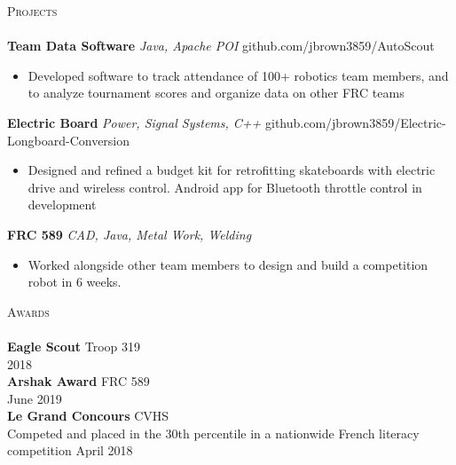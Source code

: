 \documentclass[a4paper]{article}
\newcommand{\lineunder} {
    \vspace*{-8pt} \\
    \hspace*{-18pt} \hrulefill \\
}
\newcommand{\header} [1] {
    {\hspace*{-18pt}\vspace*{6pt} \textsc{#1}}
    \vspace*{-6pt} \lineunder
}
\begin{document}
\header{Projects}
{\textbf{Team Data Software}} {\sl Java, Apache POI} \hfill github.com/jbrown3859/AutoScout\\
\begin{itemize} \itemsep 1pt
	\item Developed software to track attendance of 100+ robotics team members, and to analyze tournament scores and organize data on other FRC teams\\
\end{itemize}
\vspace*{2mm}
{\textbf{Electric Board}} {\sl Power, Signal Systems, C++} \hfill github.com/jbrown3859/Electric-Longboard-Conversion\\
\begin{itemize} \itemsep 1pt
	\item Designed and refined a budget kit for retrofitting skateboards with electric drive and wireless control. Android app for Bluetooth throttle control in development\\
\end{itemize}
\vspace*{2mm}
{\textbf{FRC 589}} {\sl CAD, Java, Metal Work, Welding} \\
\begin{itemize} \itemsep 1pt
	\item Worked alongside other team members to design and build a competition robot in 6 weeks.\\
\end{itemize}
\vspace*{2mm}

\header{Awards}
\textbf{Eagle Scout} \hfill Troop 319\\
\hfill 2018\\
\vspace*{2mm}
\textbf{Arshak Award} \hfill FRC 589\\
\hfill June 2019\\
\vspace*{2mm}
\textbf{Le Grand Concours} \hfill CVHS\\
Competed and placed in the 30th percentile in a nationwide French literacy competition \hfill April 2018\\
\vspace*{2mm}

\ 
\end{document}
